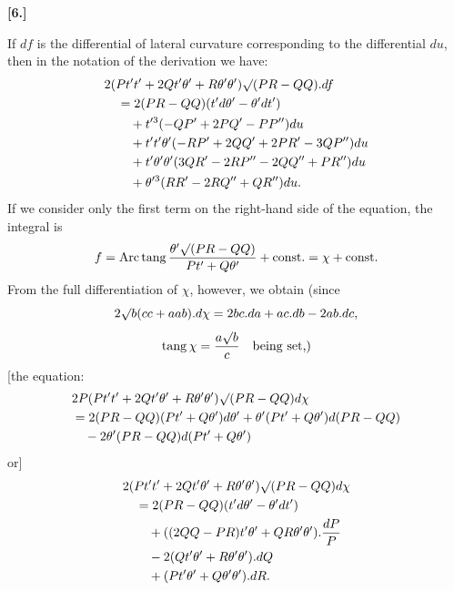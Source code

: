 %
\begin{center}\bfseries [6.]\end{center}
\noindent\hspace*{1.2em}If $df$ is the differential of lateral curvature corresponding to the differential $du$, then in the notation of the derivation we have:
\[
\begin{aligned}
&2(Pt't'+2Qt'\theta'+R\theta'\theta')\mathord{\surd}(PR-QQ).df\\
&\quad=2(PR-QQ)(t'd\theta'-\theta'dt')\\
&\qquad+t'^3(-QP'+2PQ'-PP'')du\\
&\qquad+t't'\theta'(-RP'+2QQ'+2PR'-3QP'')du\\
&\qquad+t'\theta'\theta'(3QR'-2RP''-2QQ''+PR'')du\\
&\qquad+\theta'^3(RR'-2RQ''+QR'')du.
\end{aligned}
\]
If we consider only the first term on the right-hand side of the equation, the integral is
\[
f=\operatorname{Arc\,tang}\frac{\theta'\mathord{\surd}(PR-QQ)}{Pt'+Q\theta'}+\text{const.}=\chi+\text{const.}
\]
From the full differentiation of $\chi$, however, we obtain (since
\[
2\mathord{\surd}b(cc+aab).d\chi=2bc.da+ac.db-2ab.dc,
\]
\[
\operatorname{tang}\chi=\frac{a\mathord{\surd}b}{c}\quad\text{being set,)}
\]
[the equation:
\[
\begin{aligned}
&2P(Pt't'+2Qt'\theta'+R\theta'\theta')\mathord{\surd}(PR-QQ)d\chi\\
&=2(PR-QQ)(Pt'+Q\theta')d\theta'+\theta'(Pt'+Q\theta')d(PR-QQ)\\
&\quad-2\theta'(PR-QQ)d(Pt'+Q\theta')
\end{aligned}
\]
or]
\[
\begin{aligned}
&2(Pt't'+2Qt'\theta'+R\theta'\theta')\mathord{\surd}(PR-QQ)d\chi\\
&\quad=2(PR-QQ)(t'd\theta'-\theta'dt')\\
&\qquad+((2QQ-PR)t'\theta'+QR\theta'\theta').\frac{dP}{P}\\
&\qquad-2(Qt'\theta'+R\theta'\theta').dQ\\
&\qquad+(Pt'\theta'+Q\theta'\theta').dR.
\end{aligned}
\]
